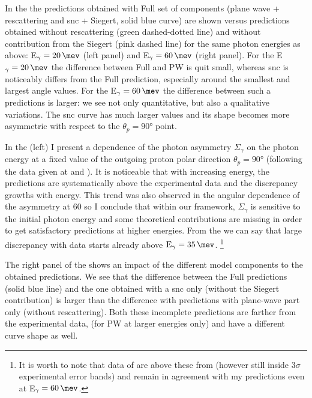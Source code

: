      In the  the predictions obtained with Full set of
     components (plane wave + rescattering and \gls{snc} + Siegert, solid blue curve) are shown
     versus predictions obtained without rescattering (green dashed-dotted line)
     and without contribution from the Siegert (pink dashed line) for the same 
     photon energies as above: E$_\gamma=\SI{20}{\mev}$ (left panel)
     and E$_\gamma=\SI{60}{\mev}$ (right panel).
     For the E$_\gamma=\SI{20}{\mev}$ the difference between Full and PW
     is quit small, whereas \gls{snc} is noticeably differs from the Full prediction,
     especially around the smallest and largest angle values.
     For the E$_\gamma=\SI{60}{\mev}$ the difference between such a predictions 
     is larger: we see not only quantitative, but also a qualitative variations.
     The \gls{snc} curve has much larger values and its shape becomes 
     more asymmetric with respect to the $\theta_p = \ang{90}$ point.

     In the  (left) I present a dependence of the photon asymmetry
     $\Sigma_\gamma$ on the photon energy at a fixed value
     of the outgoing proton polar direction $\theta_p = \ang{90}$ 
     (following the data given at \cite{delbianco_1981} and \cite{depascale_asymmetry}).
     It is noticeable that with increasing energy, the predictions
     are systematically above the experimental data and the discrepancy growths with energy.
     This trend
     was also observed in the angular dependence of the asymmetry at \SI{60}{\mev}
     so I conclude that within our framework, 
     $\Sigma_\gamma$ is sensitive to the initial photon energy and some theoretical
     contributions are missing in order to get satisfactory predictions
     at higher energies. From the  we can say that
     large discrepancy with data starts already above $\text{E}_\gamma = \SI{35}{\mev}$.
     \footnote{It is worth to note that data of \cite{depascale_asymmetry} are
     above these from \cite{delbianco_1981} (however still inside $3\sigma$ experimental
     error bands) and remain in agreement with my predictions even at E$_\gamma=\SI{60}{\mev}$.}

    The right panel of the  shows an impact of the
    different model components to the obtained predictions.
    We see that the difference between the Full predictions (solid blue line)
    and the one obtained with a \gls{snc} only (without the Siegert contribution)
    is larger than the difference with predictions with plane-wave part only (without rescattering).
    Both these incomplete predictions are farther from the experimental data,
    (for PW at larger energies only) and have a different curve shape as well. 

